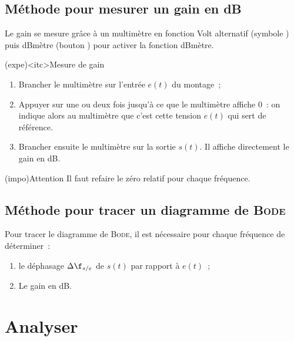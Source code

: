 \documentclass[../main/main.tex]{subfiles}
\begin{document}
{	\subsection{Méthode pour mesurer un gain en dB}

	Le gain se mesure grâce à un multimètre en fonction Volt alternatif (symbole
	) puis dBmètre (bouton ) pour activer la fonction
	dBmètre.

	\begin{tcb}(expe)<itc>{Mesure de gain}
		\begin{enumerate}
			\item Brancher le multimètre sur l'entrée $e(t)$ du montage~;
			\item Appuyer sur  une ou deux fois jusqu'à ce que le
			      multimètre affiche 0~: on indique alors au multimètre que c'est cette
			      tension $e(t)$ qui sert de référence.
			\item Brancher ensuite le multimètre sur la sortie $s(t)$. Il affiche
			      directement le gain en dB.
		\end{enumerate}
		\begin{center}
			\begin{tcb}[cnt, bld, width=.8\linewidth](impo){Attention}
				Il faut refaire le zéro relatif pour chaque fréquence.
			\end{tcb}
		\end{center}
	\end{tcb}

	\subsection{Méthode pour tracer un diagramme de \textsc{Bode}}

	Pour tracer le diagramme de \textsc{Bode}, il est nécessaire pour chaque
	fréquence de déterminer~:
	\begin{enumerate}
		\item le déphasage $\Delta\f_{s/e}$ de $s(t)$ par rapport à $e(t)$~;
		\item Le gain en dB.
	\end{enumerate}
}

\setcounter{section}{2}
\section{Analyser}
\end{document}
